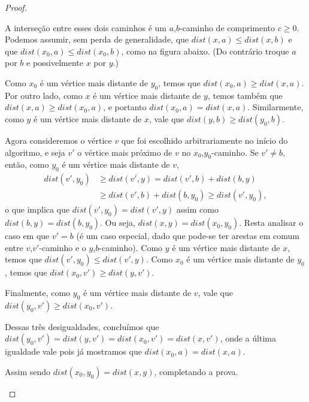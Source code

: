 \documentclass[a4paper,12pt]{article}
\begin{document}
\begin{proof}
\begin{itemize}
			A interseção entre esses dois caminhos é um 
			$a$,$b$-caminho de comprimento $c \ge 0$.
			Podemos assumir, sem perda de generalidade, que
			$dist(x,a) \le dist(x,b)$ e que
			$dist(x_0,a) \le dist(x_0,b)$, como na figura abaixo.
			(Do contrário troque $a$ por $b$ e possivelmente $x$
			por $y$.)

			\begin{center}  \end{center}


			Como $x_0$ é um vértice mais distante de $y_0$,
			temos que $dist(x_0,a) \ge dist(x,a)$.
			Por outro lado, como $x$ é um vértice mais distante
			de $y$, temos também que $dist(x,a)\ge dist(x_0,a)$,
			e portanto $dist(x_0,a) = dist(x,a)$.
			Similarmente, como $y$ é um vértice mais distante de
			$x$, vale que $dist(y,b) \ge dist(y_0,b)$.

			Agora consideremos o vértice $v$ que foi escolhido 
			arbitrariamente no início do algoritmo, e seja $v'$
			o vértice mais próximo de $v$ no $x_0$,$y_0$-caminho.
			Se $v'\ne b$, então, como $y_0$ é um vértice mais 
			distante de $v$,
			\begin{align}
				dist(v',y_0) &\ge dist(v',y) = dist(v',b) + dist(b,y)\nonumber \\
				&\ge dist(v',b) + dist(b,y_0) \ge dist(v',y_0) \nonumber,
			\end{align} 
			o que implica que $dist(v',y_0) = dist(v',y)$ assim
			como $ dist(b,y) = dist(b,y_0) $. 
			Ou seja, $dist(x,y) = dist(x_0,y_0)$.
			Resta analisar o caso em que $v'=b$ (é um caso especial,
			dado que pode-se ter arestas em comum entre $v$,$v'$-caminho 
			e o $y$,$b$-caminho).
			Como $y$ é um vértice mais distante de $x$, temos que 
			$dist(v',y_0) \le dist(v',y)$.
			Como $x_0$ é um vértice mais distante de $y_0$, temos
			que $dist(x_0,v') \ge dist(y,v')$.
			
			Finalmente, como $y_0$ é um vértice mais distante de 
			$v$, vale que $dist(y_0,v')\ge dist(x_0,v')$.

			Dessas três desigualdades, concluímos que 
			$dist(y_0,v') = dist(y,v') = dist(x_0,v') = dist(x,v') $,
			onde a última igualdade vale pois já mostramos que
			$ dist(x_0,a) = dist(x,a) $.

			Assim sendo $dist(x_0,y_0) = dist(x,y) $, completando a prova.

		\end{itemize}
	\end{proof}
\end{document}
